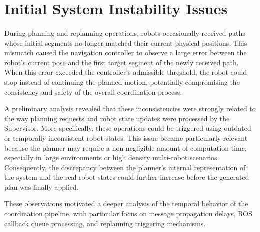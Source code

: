 \section{Initial System Instability Issues}
\label{sec:initial_issues}
\paragraph{}
During planning and replanning operations, robots occasionally received paths whose initial segments no longer matched their current physical positions. This mismatch caused the navigation controller to observe a large error between the robot's current pose and the first target segment of the newly received path. When this error exceeded the controller's admissible threshold, the robot could stop instead of continuing the planned motion, potentially compromising the consistency and safety of the overall coordination process.

A preliminary analysis revealed that these inconsistencies were strongly related to the way planning requests and robot state updates were processed by the Supervisor. More specifically, these operations could be triggered using outdated or temporally inconsistent robot states.
This issue became particularly relevant because the planner may require a non-negligible amount of computation time, especially in large environments or high density multi-robot scenarios. Consequently, the discrepancy between the planner's internal representation of the system and the real robot states could further increase before the generated plan was finally applied.

These observations motivated a deeper analysis of the temporal behavior of the coordination pipeline, with particular focus on message propagation delays, ROS callback queue processing, and replanning triggering mechanisms.